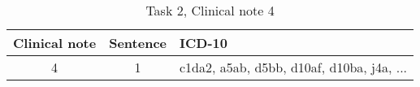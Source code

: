 \begin{table}[htbp] \footnotesize \center
\caption{Task 2, Clinical note 4 \label{tab:t2c4}}
\begin{tabularx}{\textwidth}{c c X}
    \toprule
    Clinical note & Sentence & ICD-10 \\
    \midrule
	 4 & 1 & c1da2, a5ab, d5bb, d10af, d10ba, j4a, ... \\
	\bottomrule
\end{tabularx}
\end{table}